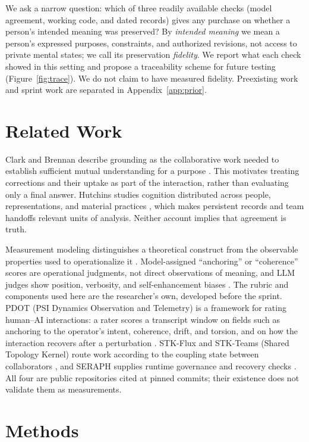 \documentclass[11pt]{article}
\begin{document}
We ask a narrow question: which of three readily available checks (model agreement, working code, and dated records) gives any purchase on whether a person's intended meaning was preserved? By \emph{intended meaning} we mean a person's expressed purposes, constraints, and authorized revisions, not access to private mental states; we call its preservation \emph{fidelity}. We report what each check showed in this setting and propose a traceability scheme for future testing (Figure~\ref{fig:trace}). We do not claim to have measured fidelity. Preexisting work and sprint work are separated in Appendix~\ref{app:prior}.

\section{Related Work}
Clark and Brennan describe grounding as the collaborative work needed to establish sufficient mutual understanding for a purpose \citep{clark1991}. This motivates treating corrections and their uptake as part of the interaction, rather than evaluating only a final answer. Hutchins studies cognition distributed across people, representations, and material practices \citep{hutchins1995}, which makes persistent records and team handoffs relevant units of analysis. Neither account implies that agreement is truth.

Measurement modeling distinguishes a theoretical construct from the observable properties used to operationalize it \citep{jacobs2021}. Model-assigned ``anchoring'' or ``coherence'' scores are operational judgments, not direct observations of meaning, and LLM judges show position, verbosity, and self-enhancement biases \citep{zheng2023}. The rubric and components used here are the researcher's own, developed before the sprint. PDOT (PSI Dynamics Observation and Telemetry) is a framework for rating human--AI interactions: a rater scores a transcript window on fields such as anchoring to the operator's intent, coherence, drift, and torsion, and on how the interaction recovers after a perturbation \citep{pdot}. STK-Flux and STK-Teams (Shared Topology Kernel) route work according to the coupling state between collaborators \citep{stkflux,stkteams}, and SERAPH supplies runtime governance and recovery checks \citep{seraph}. All four are public repositories cited at pinned commits; their existence does not validate them as measurements.

\section{Methods}
\end{document}
